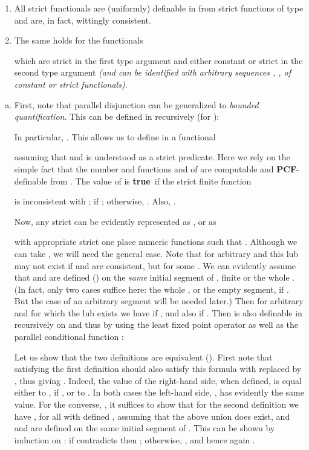 \documentclass[fleqn]{LMCS}
\theoremstyle{plain}\newtheorem{satz}[thm]{Satz}
\theoremstyle{plain}\newtheorem{hyp}[thm]{Hypothesis}
\theoremstyle{plain}\newtheorem{hyps}[thm]{Hypotheses}
\theoremstyle{definition}\newtheorem{note}[thm]{Note}
\newcommand{\PCF}{\mbox{\bf PCF}}
\newcommand{\?}{\mbox{?}}
\newcommand{\true}{\mbox{\bf true}}
\begin{document}
\begin{lem}\label{lemma:strict-def}\hfill
\begin{enumerate}[\em(a)]
\item All strict functionals  are 
(uniformly) definable in  from strict 
functions of type 
 and are, in fact, wittingly consistent. 

\item The same holds for the functionals 
 
which are strict in the first type  argument 
and either constant or strict in the second 
type \mbox{} argument
{\em(and can be identified with arbitrary sequences 
, 
, of constant or strict functionals)}. 
\end{enumerate}
\end{lem}
\proof\hfill  \begin{enumerate}[(a)]
\item First, note that parallel disjunction can be generalized 
to \emph{bounded quantification}. This can be defined in  
recursively (for ): 

In particular, . 
This allows us to define in  a functional 

assuming that 
 and 
 is understood as a strict predicate. 
Here we rely on the simple fact that the number  and functions 
 and  of  are computable and \PCF-definable from . 
The value of  is \true\ if the strict finite function 

is inconsistent with ;  if  
; 
otherwise, . Also, . 






Now, any strict  can be evidently represented as   
, or as 

with appropriate strict one place numeric functions  
such that . Although we can take , 
we will need the general case. Note that for arbitrary  and  
this lub may not 
exist if  and  
are consistent, but  
for some . 
We can evidently assume that  and  are 
defined () on the \emph{same} 
initial segment of , finite or the whole . 
(In fact, only two cases suffice here: the whole , or 
the empty segment, if . 
But the case of an arbitrary segment will be needed later.)
Then for arbitrary  and  
for which the lub  exists
we have  if , 
and
also 
 if . 
Then  is also definable 
in  recursively on  and thus by using the least fixed point 
operator  as well as 
the parallel conditional function : 

Let us show that the two definitions are equivalent (). 
First note that 
 satisfying the first definition should also satisfy this formula 
with  replaced by , thus giving . 
Indeed, the value of the right-hand side, when defined, is equal either to 
, if 
, 
or to 
. 
In both cases the left-hand side, , has evidently the same value. 
For the converse, , it suffices to show that 
for the second definition 
we have 
, 
for all  with defined , 
assuming that the above union does exist, and  and  are 
defined on the same initial segment of . 
This can be shown by induction on : 
if  contradicts  then 
; 
otherwise, , and hence again  
. 



\end{enumerate}
\end{document}
